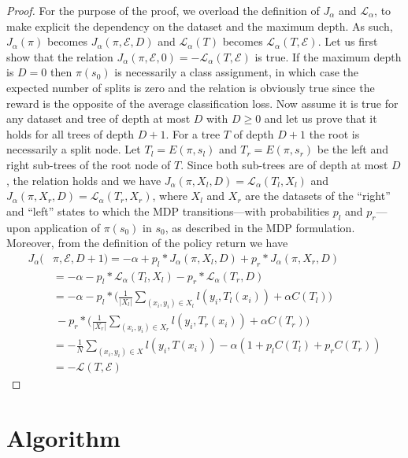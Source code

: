 \begin{proof}
For the purpose of the proof, we overload the definition of $J_\alpha$ and $\mathcal L_\alpha$, to make explicit the dependency on the dataset and the maximum depth. 
As such, $J_\alpha(\pi)$ becomes $J_\alpha(\pi, {\mathcal E}, D)$ and ${\mathcal L}_\alpha(T)$ becomes ${\mathcal L}_\alpha(T, {\mathcal E})$. 
Let us first show that the relation $J_\alpha(\pi, {\mathcal E}, 0) = -{\mathcal L}_\alpha(T, {\mathcal E})$ is true. 
If the maximum depth is $D = 0$ then $\pi(s_0)$ is necessarily a class assignment, in which case the expected number of splits is zero and the relation is obviously true since the reward is the opposite of the average classification loss. 
Now assume it is true for any dataset and tree of depth at most $D$ with $D \geq 0$ and let us prove that it holds for all trees of depth $D + 1$. 
For a tree $T$ of depth $D + 1$ the root is necessarily a split node. Let $T_l = E(\pi, s_l)$ and $T_r = E(\pi, s_r)$ be the left and right sub-trees of the root node of $T$. 
Since both sub-trees are of depth at most $D$, the relation holds and we have $J_\alpha(\pi, X_l, D) = {\mathcal L}_\alpha(T_l, X_l)$ and $J_\alpha(\pi, X_r, D) = {\mathcal L}_\alpha(T_r, X_r)$, where $X_l$ and $X_r$ are the datasets of the ``right'' and ``left'' states to which the MDP transitions---with probabilities $p_l$ and $p_r$---upon application of $\pi(s_0)$ in $s_0$, as described in the MDP formulation. 
Moreover, from the definition of the policy return we have 
\begin{align*}
   J_\alpha(&\pi, {\mathcal E}, D + 1) = -\alpha + p_l * J_\alpha(\pi, X_l, D) + p_r * J_\alpha(\pi, X_r, D)\\
   &= -\alpha - p_l * {\mathcal L}_\alpha(T_l, X_l) - p_r * {\mathcal L}_\alpha(T_r, D)\\
   &= -\alpha - p_l * \Bigg(\frac{1}{|X_l|}\sum_{(x_i, y_i)\in X_l}l(y_i, T_l(x_i))  + \alpha C(T_l)\Bigg)\\
   &\ - p_r * \Bigg(\frac{1}{|X_r|}\sum_{(x_i, y_i)\in X_r}l(y_i, T_r(x_i))  + \alpha C(T_r)\Bigg)\\
   &= -\frac{1}{N}\sum_{(x_i, y_i)\in X}l(y_i, T(x_i)) - \alpha (1 + p_l C(T_l) + p_r C(T_r))\\
   &= -{\mathcal L}(T, {\mathcal E}) 
\end{align*}
\end{proof}

\section{Algorithm}\label{sec:dpdt}

